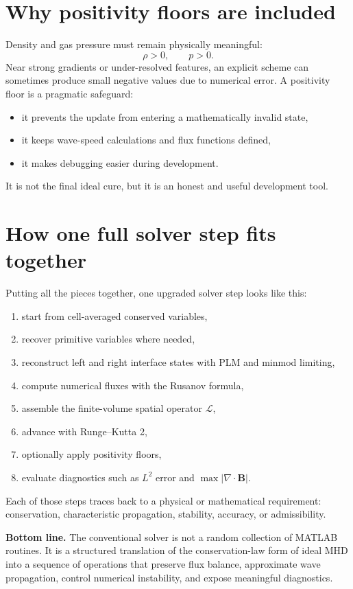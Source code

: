 \documentclass[11pt]{article}
\newcommand{\Bvec}{\mathbf{B}}
\begin{document}
\section{Why positivity floors are included}
Density and gas pressure must remain physically meaningful:
\begin{equation}
\rho>0,\qquad p>0.
\end{equation}
Near strong gradients or under-resolved features, an explicit scheme can sometimes produce small negative values due to numerical error. A positivity floor is a pragmatic safeguard:
\begin{itemize}[leftmargin=1.8em]
    \item it prevents the update from entering a mathematically invalid state,
    \item it keeps wave-speed calculations and flux functions defined,
    \item it makes debugging easier during development.
\end{itemize}
It is not the final ideal cure, but it is an honest and useful development tool.

\section{How one full solver step fits together}
Putting all the pieces together, one upgraded solver step looks like this:
\begin{enumerate}[leftmargin=1.8em]
    \item start from cell-averaged conserved variables,
    \item recover primitive variables where needed,
    \item reconstruct left and right interface states with PLM and minmod limiting,
    \item compute numerical fluxes with the Rusanov formula,
    \item assemble the finite-volume spatial operator $\mathcal{L}$,
    \item advance with Runge--Kutta 2,
    \item optionally apply positivity floors,
    \item evaluate diagnostics such as $L^2$ error and $\max|\nabla\cdot\Bvec|$.
\end{enumerate}
Each of those steps traces back to a physical or mathematical requirement:
conservation, characteristic propagation, stability, accuracy, or admissibility.

\begin{physicsbox}
\textbf{Bottom line.} The conventional solver is not a random collection of MATLAB routines. It is a structured translation of the conservation-law form of ideal MHD into a sequence of operations that preserve flux balance, approximate wave propagation, control numerical instability, and expose meaningful diagnostics.
\end{physicsbox}
\end{document}
